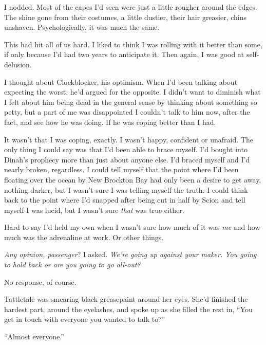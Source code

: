 I nodded.  Most of the capes I'd seen were just a little rougher around the edges.  The shine gone from their costumes, a little dustier, their hair greasier, chins unshaven.  Psychologically, it was much the same.



This had hit all of us hard.  I liked to think I was rolling with it better than some, if only because I'd had two years to anticipate it.  Then again, I was good at self-delusion.



I thought about Clockblocker, his optimism.  When I'd been talking about expecting the worst, he'd argued for the opposite.  I didn't want to diminish what I felt about him being dead in the general sense by thinking about something so petty, but a part of me was disappointed I couldn't talk to him now, after the fact, and see how he was doing.  If he was coping better than I had.



It wasn't that I was coping, exactly.  I wasn't happy, confident or unafraid.  The only thing I could say was that I'd been able to brace myself.  I'd bought into Dinah's prophecy more than just about anyone else.  I'd braced myself and I'd nearly broken, regardless.  I could tell myself that the point where I'd been floating over the ocean by New Brockton Bay had only been a desire to get away, nothing darker, but I wasn't sure I was telling myself the truth.  I could think back to the point where I'd snapped after being cut in half by Scion and tell myself I was lucid, but I wasn't sure \emph{that} was true either.



Hard to say I'd held my own when I wasn't sure how much of it was \emph{me} and how much was the adrenaline at work.  Or other things.



\emph{Any opinion, passenger}?  I asked.  \emph{We're going up against your maker.  You going to hold back or are you going to go all-out?}



No response, of course.



Tattletale was smearing black greasepaint around her eyes.  She'd finished the hardest part, around the eyelashes, and spoke up as she filled the rest in,  ``You get in touch with everyone you wanted to talk to?''



``Almost everyone.''



